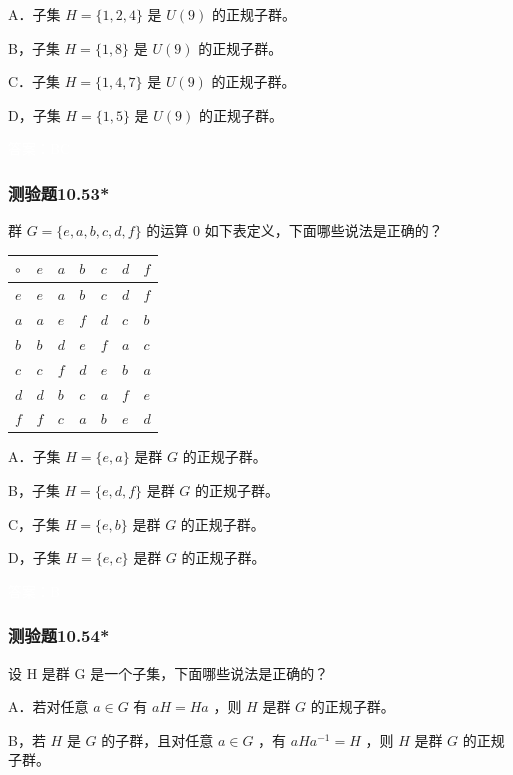 \documentclass[UTF8, heading=true]{ctexart}
\begin{document}
A．子集 $H=\{1,2,4\}$ 是 $U(9)$ 的正规子群。

B，子集 $H=\{1,8\}$ 是 $U(9)$ 的正规子群。

C．子集 ${H}=\{1,4,7\}$ 是 ${U}(9)$ 的正规子群。

D，子集 $H=\{1,5\}$ 是 $U(9)$ 的正规子群。

\textcolor{white}{答案：BC}

\subsubsection{测验题10.53*}

群 $G=\{e, a, b, c, d, f\}$ 的运算 0 如下表定义，下面哪些说法是正确的？

\begin{table}[H]
  \renewcommand{\arraystretch}{1.5}
  \centering
\begin{tabular}{l|llllll}
\hline$\circ$ & $e$ & $a$ & $b$ & $c$ & $d$ & $f$ \\
\hline$e$ & $e$ & $a$ & $b$ & $c$ & $d$ & $f$ \\
$a$ & $a$ & $e$ & $f$ & $d$ & $c$ & $b$ \\
$b$ & $b$ & $d$ & $e$ & $f$ & $a$ & $c$ \\
$c$ & $c$ & $f$ & $d$ & $e$ & $b$ & $a$ \\
$d$ & $d$ & $b$ & $c$ & $a$ & $f$ & $e$ \\
$f$ & $f$ & $c$ & $a$ & $b$ & $e$ & $d$ \\
\hline
\end{tabular}
\end{table}

A．子集 $H=\{e, a\}$ 是群 $G$ 的正规子群。

B，子集 $H=\{e, d, f\}$ 是群 $G$ 的正规子群。

C，子集 $H=\{e, b\}$ 是群 $G$ 的正规子群。

D，子集 $H=\{e, c\}$ 是群 $G$ 的正规子群。

\textcolor{white}{答案：B}

\subsubsection{测验题10.54*}

设 H 是群 G 是一个子集，下面哪些说法是正确的？

A．若对任意 $a \in G$ 有 $a H=H a$ ，则 $H$ 是群 $G$ 的正规子群。

B，若 $H$ 是 $G$ 的子群，且对任意 $a \in G$ ，有 $a H a^{-1}=H$ ，则 $H$ 是群 $G$ 的正规子群。
\end{document}
